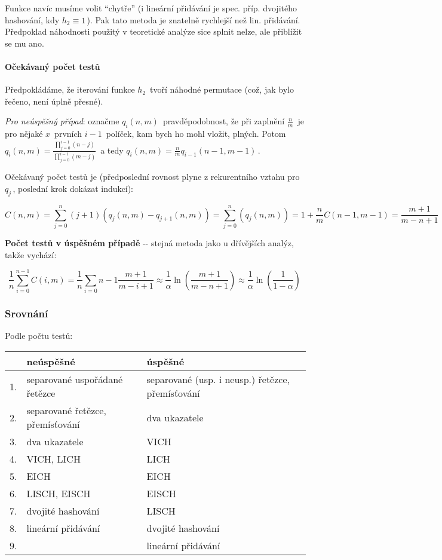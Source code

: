 Funkce navíc musíme volit ``chytře'' (i lineární přidávání je spec.
příp. dvojitého hashování, kdy \(h_2 \equiv 1\,\!\)). Pak tato metoda je
znatelně rychlejší než lin. přidávání. Předpoklad náhodnosti použitý v
teoretické analýze sice splnit nelze, ale přiblížit se mu ano.

\paragraph{Očekávaný počet
testů}\label{oux10dekuxe1vanuxfd-poux10det-testux16f-1}

Předpokládáme, že iterování funkce \(h_2\,\!\) tvoří náhodné permutace
(což, jak bylo řečeno, není úplně přesné).

\emph{Pro neúspěšný případ}: označme \(q_i(n,m)\,\!\) pravděpodobnost,
že při zaplnění \(\frac{n}{m}\,\!\) je pro nějaké \(x\,\!\) prvních
\(i-1\,\!\) políček, kam bych ho mohl vložit, plných. Potom
\(q_i(n,m) = \frac{\prod_{j=0}^{i-1}(n-j)}{\prod_{j=0}^{i-1}(m-j)}\,\!\)
a tedy \(q_i(n,m)=\frac{n}{m}q_{i-1}(n-1,m-1)\,\!\).

Očekávaný počet testů je (předposlední rovnost plyne z rekurentního
vztahu pro \(q_j\,\!\), poslední krok dokázat indukcí):

\[C(n,m)=\sum_{j=0}^n(j+1)(q_j(n,m)-q_{j+1}(n,m))=\sum_{j=0}^n(q_j(n,m))=1+\frac{n}{m}C(n-1,m-1)=\frac{m+1}{m-n+1}\,\!\]

\textbf{Počet testů v úspěšném případě} -\/- stejná metoda jako u
dřívějších analýz, takže vychází:

\[\frac{1}{n}\sum_{i=0}^{n-1}C(i,m)=\frac{1}{n}\sum_{i=0}{n-1}\frac{m+1}{m-i+1}\approx\frac{1}{\alpha}\ln\left(\frac{m+1}{m-n+1}\right)\approx\frac{1}{\alpha}\ln\left(\frac{1}{1-\alpha}\right)\,\!\]

\subsubsection{Srovnání}\label{srovnuxe1nuxed}

Podle počtu testů:

\begin{longtable}[]{@{}lll@{}}
\toprule
& neúspěšné & úspěšné\tabularnewline
\midrule
\endhead
1. & separované uspořádané řetězce & separované (usp. i neusp.) řetězce,
přemísťování\tabularnewline
2. & separované řetězce, přemísťování & dva ukazatele\tabularnewline
3. & dva ukazatele & VICH\tabularnewline
4. & VICH, LICH & LICH\tabularnewline
5. & EICH & EICH\tabularnewline
6. & LISCH, EISCH & EISCH\tabularnewline
7. & dvojité hashování & LISCH\tabularnewline
8. & lineární přidávání & dvojité hashování\tabularnewline
9. & & lineární přidávání\tabularnewline
\bottomrule
\end{longtable}

